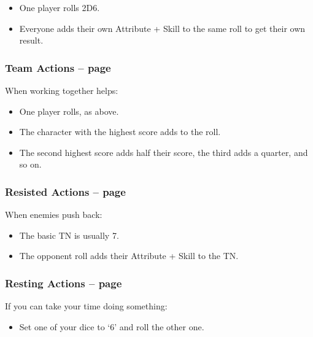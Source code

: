\begin{multicols}{2}
\begin{itemize}
  \item
  One player rolls 2D6.
  \item
  Everyone adds their own Attribute + Skill to the same roll to get their own result.

\end{itemize}

\subsubsection{Team Actions -- page \pageref{teamwork}}

When working together helps:

\begin{itemize}

  \item
  One player rolls, as above.
  \item
  The character with the highest score adds to the roll.
  \item
  The second highest score adds half their score, the third adds a quarter, and so on.

\end{itemize}

\subsubsection{Resisted Actions -- page \pageref{resistedactions}}

When enemies push back:

\begin{itemize}

  \item{The basic TN is usually 7.}
  \item{The opponent roll adds their Attribute + Skill to the TN.}

\end{itemize}

\subsubsection{Resting Actions -- page \pageref{restingactions}}

If you can take your time doing something:

\begin{itemize}

  \item{Set one of your dice to `6' and roll the other one.}
  
\end{itemize}


\end{multicols}
